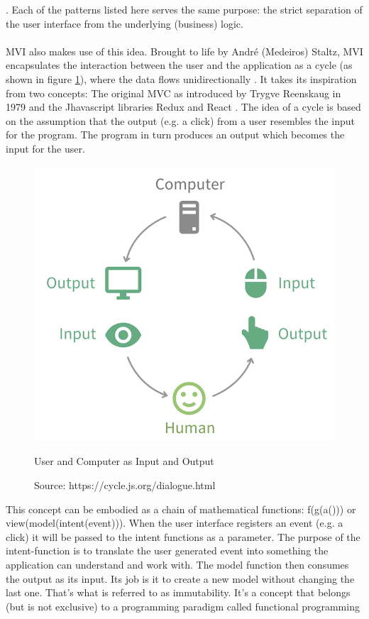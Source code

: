 \cite{youtubeAndreStaltzUserFunction}. 
Each of the patterns listed here serves the same purpose: the strict separation of the user interface from the underlying (business) logic.
\\
\\
MVI also makes use of this idea. Brought to life by André (Medeiros) Staltz, MVI encapsulates the interaction between the user and the application as a cycle 
(as shown in figure 
\ref{fig:userComputerInputOutput}), 
where the data flows unidirectionally 
\cite{unidirectionalDataFlowRedux}.
It takes its inspiration from two concepts: The original MVC as introduced by Trygve Reenskaug in 1979 
\cite{wikipediaTrygveReenskaug} 
and the Jhavascript libraries Redux 
\cite{redux} 
and React 
\cite{react}. 
The idea of a cycle is based on the assumption that the output (e.g. a click) from a user resembles the input for the program. The program in turn produces an output 
which becomes the input for the user.
\begin{figure}[ht]
    \centering
    \includegraphics[height=0.5\textwidth]{./images/mvi-cycle}
    \caption{User and Computer as Input and Output}
    \caption*{Source: https://cycle.js.org/dialogue.html}
    \label{fig:userComputerInputOutput}
\end{figure}
This concept can be embodied as a chain of mathematical functions: f(g(a())) or view(model(intent(event))).
When the user interface registers an event (e.g. a click) it will be passed to the intent functions as a parameter. 
The purpose of the intent-function is to translate the user generated event into something the application can understand and work with.
The model function then consumes the output as its input. Its job is it to create a new model without changing the last one. That's what is referred to as immutability. 
\cite{immutableObjectsEffectiveJava}
It's a concept that belongs (but is not exclusive) to a programming paradigm called functional programming
